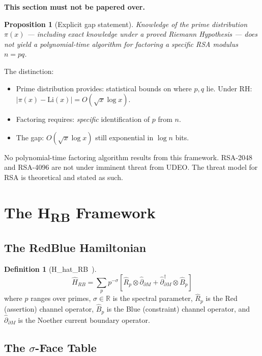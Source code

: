 \documentclass[runningheads]{llncs}
\theoremstyle{plain}
\newtheorem{proposition}[theorem]{Proposition}
\theoremstyle{definition}
\newtheorem{definition}[theorem]{Definition}
\begin{document}
\textbf{This section must not be papered over.}

\begin{proposition}[Explicit gap statement]
Knowledge of the prime distribution $\pi(x)$ — including exact knowledge
under a proved Riemann Hypothesis — does not yield a polynomial-time
algorithm for factoring a specific RSA modulus $n = pq$.
\end{proposition}

The distinction:
\begin{itemize}
\item Prime distribution provides: statistical bounds on where $p, q$ lie.
      Under RH: $|\pi(x) - \mathrm{Li}(x)| = O(\sqrt{x} \log x)$.
\item Factoring requires: \emph{specific} identification of $p$ from $n$.
\item The gap: $O(\sqrt{x} \log x)$ still exponential in $\log n$ bits.
\end{itemize}

No polynomial-time factoring algorithm results from this framework.
RSA-2048 and RSA-4096 are not under imminent threat from UDEO.
The threat model for RSA is theoretical and stated as such.


\section{The H\textsubscript{RB} Framework}
\label{sec:hrb}

\subsection{The RedBlue Hamiltonian}
\label{sec:hamiltonian}

\begin{definition}[H\_hat\_RB~\cite{Allison2026}]
\[
\hat{H}_{RB} = \sum_p p^{-\sigma}
\left[\hat{R}_p \otimes \hat{\partial}_{\partial M} +
\hat{\partial}_{\partial M}^\dagger \otimes \hat{B}_p\right]
\]
where $p$ ranges over primes, $\sigma \in \mathbb{R}$ is the spectral parameter,
$\hat{R}_p$ is the Red (assertion) channel operator, $\hat{B}_p$ is the Blue
(constraint) channel operator, and $\hat{\partial}_{\partial M}$ is the Noether
current boundary operator.
\end{definition}

\subsection{The $\sigma$-Face Table}
\end{document}
